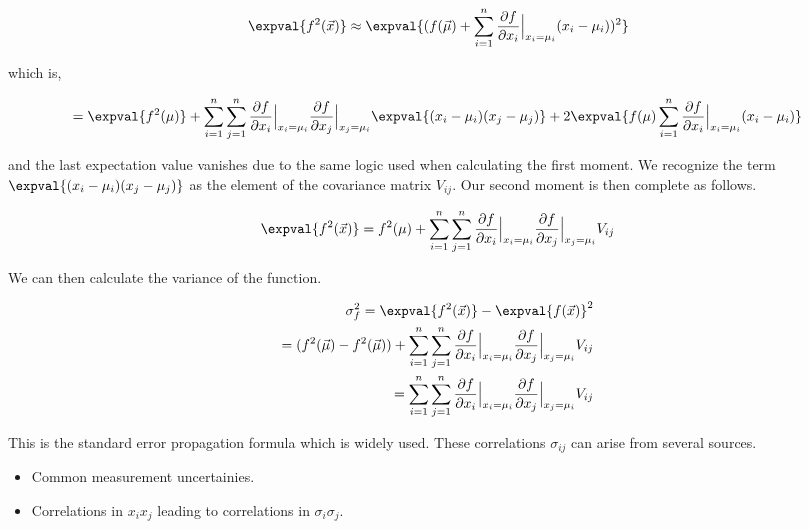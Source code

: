 \begin{equation}
        \expval{f^2(\vec{x})} \approx \expval{ (f(\vec{\mu}) + \sum_{i=1}^{n} \frac{\partial f}{\partial x_i} \Bigr|_{x_i = \mu_i} (x_i - \mu_i))^2 }
\end{equation}

which is, 

\begin{equation}
        = \expval{f^2(\mu)} + \sum_{i=1}^{n} \sum_{j=1}^{n} \frac{\partial f}{\partial x_i} \Bigr|_{x_i = \mu_i} \frac{\partial f}{\partial x_j} \Bigr|_{x_j = \mu_i} \expval{(x_i - \mu_i)(x_j - \mu_j)} + 2 \expval{f(\mu) \sum_{i=1}^{n} \frac{\partial f}{\partial x_i} \Bigr|_{x_i = \mu_i} (x_i-\mu_i)}
\end{equation}

and the last expectation value vanishes due to the same logic used when calculating the first moment.  We recognize the term $\expval{(x_i - \mu_i)(x_j - \mu_j)}$ as the element of the covariance matrix $V_{ij}$.  Our second moment is then complete as follows.

\begin{equation}
        \expval{f^2(\vec{x})}  = f^2(\mu) + \sum_{i=1}^{n} \sum_{j=1}^{n} \frac{\partial f}{\partial x_i} \Bigr|_{x_i = \mu_i} \frac{\partial f}{\partial x_j} \Bigr|_{x_j = \mu_i} V_{ij}
\end{equation}

We can then calculate the variance of the function.

\begin{align} 
    \sigma_{f}^2 = \expval{f^2(\vec{x})} - \expval{f(\vec{x})}^2 \\ 
    = (f^2(\vec{\mu}) - f^2(\vec{\mu})) + \sum_{i=1}^{n} \sum_{j=1}^{n} \frac{\partial f}{\partial x_i} \Bigr|_{x_i = \mu_i} \frac{\partial f}{\partial x_j} \Bigr|_{x_j = \mu_i} V_{ij} \\
    = \sum_{i=1}^{n} \sum_{j=1}^{n} \frac{\partial f}{\partial x_i} \Bigr|_{x_i = \mu_i} \frac{\partial f}{\partial x_j} \Bigr|_{x_j = \mu_i} V_{ij} 
\end{align}

This is the standard error propagation formula which is widely used.  These correlations $\sigma_{ij}$ can arise from several sources.

\begin{itemize}
    \item{Common measurement uncertainies.}
    \item{Correlations in $x_i x_j$ leading to correlations in $\sigma_i \sigma_j$.}
\end{itemize}

